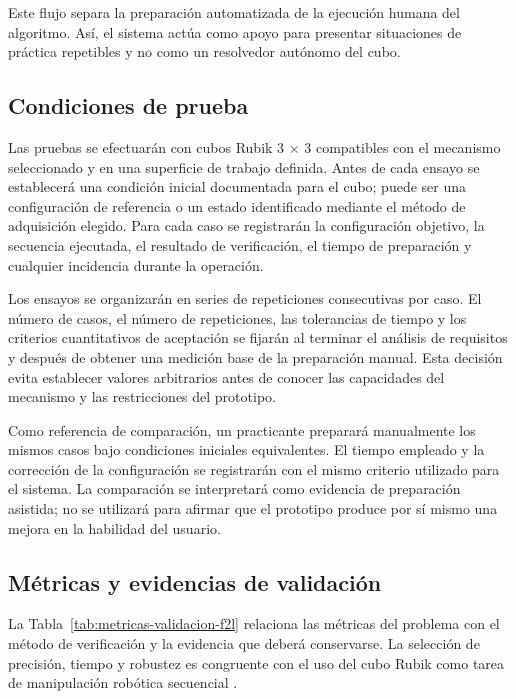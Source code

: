 Este flujo separa la preparación automatizada de la ejecución humana del algoritmo. Así, el sistema actúa como apoyo para presentar situaciones de práctica repetibles y no como un resolvedor autónomo del cubo.

\subsection{Condiciones de prueba}

Las pruebas se efectuarán con cubos Rubik 3 $\times$ 3 compatibles con el mecanismo seleccionado y en una superficie de trabajo definida. Antes de cada ensayo se establecerá una condición inicial documentada para el cubo; puede ser una configuración de referencia o un estado identificado mediante el método de adquisición elegido. Para cada caso se registrarán la configuración objetivo, la secuencia ejecutada, el resultado de verificación, el tiempo de preparación y cualquier incidencia durante la operación.

Los ensayos se organizarán en series de repeticiones consecutivas por caso. El número de casos, el número de repeticiones, las tolerancias de tiempo y los criterios cuantitativos de aceptación se fijarán al terminar el análisis de requisitos y después de obtener una medición base de la preparación manual. Esta decisión evita establecer valores arbitrarios antes de conocer las capacidades del mecanismo y las restricciones del prototipo.

Como referencia de comparación, un practicante preparará manualmente los mismos casos bajo condiciones iniciales equivalentes. El tiempo empleado y la corrección de la configuración se registrarán con el mismo criterio utilizado para el sistema. La comparación se interpretará como evidencia de preparación asistida; no se utilizará para afirmar que el prototipo produce por sí mismo una mejora en la habilidad del usuario.

\subsection{Métricas y evidencias de validación}

La Tabla~\ref{tab:metricas-validacion-f2l} relaciona las métricas del problema con el método de verificación y la evidencia que deberá conservarse. La selección de precisión, tiempo y robustez es congruente con el uso del cubo Rubik como tarea de manipulación robótica secuencial \cite{Yang2020}.

